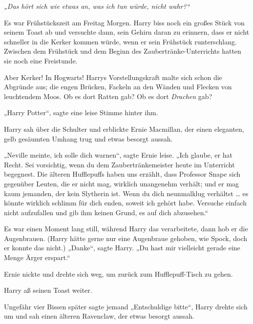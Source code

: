 

\hypertarget{hackordnung}{%

\later

\emph{„Das hört sich wie etwas an, was ich tun würde, nicht wahr?“}

\later

Es war Frühstückszeit am Freitag Morgen. Harry biss noch ein großes Stück von seinem Toast ab und versuchte dann, sein Gehirn daran zu erinnern, dass er nicht schneller in die Kerker kommen würde, wenn er sein Frühstück runterschlang. Zwischen dem Frühstück und dem Beginn des Zaubertränke-Unterrichts hatten sie noch eine Freistunde.

Aber Kerker! In Hogwarts! Harrys Vorstellungskraft malte sich schon die Abgründe aus; die engen Brücken, Fackeln an den Wänden und Flecken von leuchtendem Moos. Ob es dort Ratten gab? Ob es dort \emph{Drachen} gab?

„Harry Potter“, sagte eine leise Stimme hinter ihm.

Harry sah über die Schulter und erblickte Ernie Macmillan, der einen eleganten, gelb gesäumten Umhang trug und etwas besorgt aussah.

„Neville meinte, ich solle dich warnen“, sagte Ernie leise. „Ich glaube, er hat Recht. Sei vorsichtig, wenn du dem Zaubertränkemeister heute im Unterricht begegnest. Die älteren Hufflepuffs haben uns erzählt, dass Professor Snape sich gegenüber Leuten, die er nicht mag, wirklich unangenehm verhält; und er mag kaum jemanden, der kein Slytherin ist. Wenn du dich neunmalklug verhältst … es könnte wirklich schlimm für dich enden, soweit ich gehört habe. Versuche einfach nicht aufzufallen und gib ihm keinen Grund, es auf dich abzusehen.“

Es war einen Moment lang still, während Harry das verarbeitete, dann hob er die Augenbrauen. (Harry hätte gerne nur eine Augenbraue gehoben, wie Spock, doch er konnte das nicht.) „Danke“, sagte Harry. „Du hast mir vielleicht gerade eine Menge Ärger erspart.“

Ernie nickte und drehte sich weg, um zurück zum Hufflepuff-Tisch zu gehen.

Harry aß seinen Toast weiter.

Ungefähr vier Bissen später sagte jemand „Entschuldige bitte“, Harry drehte sich um und sah einen älteren Ravenclaw, der etwas besorgt aussah.

}
